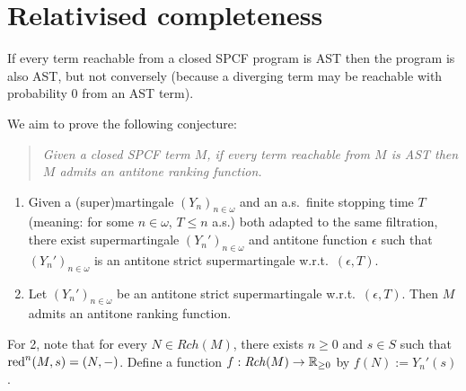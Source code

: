 
\section{Relativised completeness}
\label{sec:Relativised completeness}

If every term reachable from a closed SPCF program is AST then the program is also AST, but not conversely 
(because a diverging term may be reachable with probability 0 from an AST term).

We aim to prove the following conjecture:

\begin{quote}
\emph{Given a closed SPCF term $M$, if every term reachable from $M$ is AST then $M$ admits an antitone ranking function.}
\end{quote}

\begin{enumerate}

\item Given a (super)martingale $(Y_n)_{n \in \omega}$ and an a.s.~finite stopping time $T$ (meaning: for some $n \in \omega$, $T \leq n$ a.s.) both adapted to the same filtration, there exist supermartingale $(Y_n')_{n \in \omega}$ and antitone function $\epsilon$ such that $(Y_n')_{n \in \omega}$ is an antitone strict supermartingale w.r.t.~$(\epsilon, T)$.

\item Let $(Y_n')_{n \in \omega}$ be an antitone strict supermartingale w.r.t.~$(\epsilon, T)$. 
Then $M$ admits an antitone ranking function.
\end{enumerate}

For 2, note that for every $N \in \mathit{Rch}(M)$, there exists $n \geq 0$ and $s \in S$ such that $\operatorname{red}^n(M, s) = (N, -)$.
Define a function $f : \mathit{Rch}(M) \to \mathbb{R}_{{\geq}0}$ by $f(N) := Y_n'(s)$.



